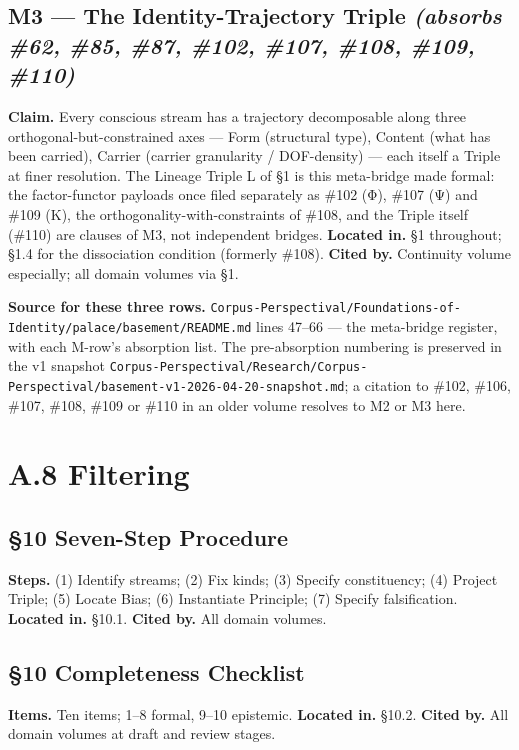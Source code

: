 \documentclass[11pt, openany]{book}
\newcommand{\sectionbreak}{\clearpage}
\begin{document}
\subsection{M3 --- The Identity-Trajectory Triple \textit{(absorbs \#62, \#85, \#87, \#102, \#107, \#108, \#109, \#110)}}
\textbf{Claim.} Every conscious stream has a trajectory decomposable along three orthogonal-but-constrained axes --- Form (structural type), Content (what has been carried), Carrier (carrier granularity / DOF-density) --- each itself a Triple at finer resolution. The Lineage Triple L of §1 is this meta-bridge made formal: the factor-functor payloads once filed separately as \#102 (Φ), \#107 (Ψ) and \#109 (Κ), the orthogonality-with-constraints of \#108, and the Triple itself (\#110) are clauses of M3, not independent bridges.
\textbf{Located in.} §1 throughout; §1.4 for the dissociation condition (formerly \#108).
\textbf{Cited by.} Continuity volume especially; all domain volumes via §1.

\textbf{Source for these three rows.} \texttt{Corpus-Perspectival/Foundations-of-Identity/palace/basement/README.md} lines 47–66 --- the meta-bridge register, with each M-row's absorption list. The pre-absorption numbering is preserved in the v1 snapshot \texttt{Corpus-Perspectival/Research/Corpus-Perspectival/basement-v1-2026-04-20-snapshot.md}; a citation to \#102, \#106, \#107, \#108, \#109 or \#110 in an older volume resolves to M2 or M3 here.

\sectionbreak

\section{A.8 Filtering}

\subsection{§10 Seven-Step Procedure}
\textbf{Steps.} (1) Identify streams; (2) Fix kinds; (3) Specify constituency; (4) Project Triple; (5) Locate Bias; (6) Instantiate Principle; (7) Specify falsification.
\textbf{Located in.} §10.1.
\textbf{Cited by.} All domain volumes.

\subsection{§10 Completeness Checklist}
\textbf{Items.} Ten items; 1–8 formal, 9–10 epistemic.
\textbf{Located in.} §10.2.
\textbf{Cited by.} All domain volumes at draft and review stages.
\end{document}
